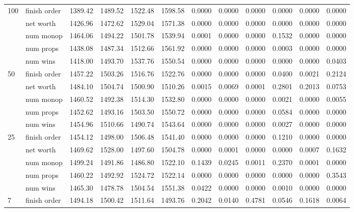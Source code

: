 \begin{landscape}
\begin{table}[ht]
\begin{tabularx}{\linewidth}{|p{1in}|p{1in}|r|r|r|r|r|r|r|r|r|r|}
      \multirow{5}{*}{100} & finish order & 1389.42 & 1489.52 & 1522.48 & 1598.58 & 0.0000 & 0.0000 & 0.0000 & 0.0000 & 0.0000 & 0.0000 \\
\cline{2-12}      & net worth & 1426.96 & 1472.62 & 1529.04 & 1571.38 & 0.0000 & 0.0000 & 0.0000 & 0.0000 & 0.0000 & 0.0000 \\
\cline{2-12}      & num monop & 1464.06 & 1494.22 & 1501.78 & 1539.94 & 0.0001 & 0.0000 & 0.0000 & 0.1532 & 0.0000 & 0.0000 \\
\cline{2-12}      & num props & 1438.08 & 1487.34 & 1512.66 & 1561.92 & 0.0000 & 0.0000 & 0.0000 & 0.0003 & 0.0000 & 0.0000 \\
\cline{2-12}      & num wins & 1418.00 & 1493.70 & 1537.76 & 1550.54 & 0.0000 & 0.0000 & 0.0000 & 0.0000 & 0.0000 & 0.0403 \\
      \cline{1-12}
      \multirow{5}{*}{50} & finish order & 1457.22 & 1503.26 & 1516.76 & 1522.76 & 0.0000 & 0.0000 & 0.0000 & 0.0400 & 0.0021 & 0.2124 \\
\cline{2-12}      & net worth & 1484.10 & 1504.74 & 1500.90 & 1510.26 & 0.0015 & 0.0069 & 0.0001 & 0.2801 & 0.2013 & 0.0753 \\
\cline{2-12}      & num monop & 1460.52 & 1492.38 & 1514.30 & 1532.80 & 0.0000 & 0.0000 & 0.0000 & 0.0021 & 0.0000 & 0.0055 \\
\cline{2-12}      & num props & 1452.62 & 1493.16 & 1503.50 & 1550.72 & 0.0000 & 0.0000 & 0.0000 & 0.0584 & 0.0000 & 0.0000 \\
\cline{2-12}      & num wins & 1454.96 & 1510.66 & 1490.74 & 1543.64 & 0.0000 & 0.0000 & 0.0000 & 0.0027 & 0.0000 & 0.0000 \\
      \cline{1-12}
      \multirow{5}{*}{25} & finish order & 1454.12 & 1498.00 & 1506.48 & 1541.40 & 0.0000 & 0.0000 & 0.0000 & 0.1210 & 0.0000 & 0.0000 \\
\cline{2-12}      & net worth & 1469.62 & 1528.00 & 1497.60 & 1504.78 & 0.0000 & 0.0001 & 0.0000 & 0.0000 & 0.0007 & 0.1632 \\
\cline{2-12}      & num monop & 1499.24 & 1491.86 & 1486.80 & 1522.10 & 0.1439 & 0.0245 & 0.0011 & 0.2370 & 0.0001 & 0.0000 \\
\cline{2-12}      & num props & 1460.22 & 1492.92 & 1524.72 & 1522.14 & 0.0000 & 0.0000 & 0.0000 & 0.0000 & 0.0000 & 0.3543 \\
\cline{2-12}      & num wins & 1465.30 & 1478.78 & 1504.54 & 1551.38 & 0.0422 & 0.0000 & 0.0000 & 0.0010 & 0.0000 & 0.0000 \\
      \cline{1-12}
      \multirow{5}{*}{7} & finish order & 1494.18 & 1500.42 & 1511.64 & 1493.76 & 0.2042 & 0.0140 & 0.4781 & 0.0546 & 0.1618 & 0.0064 \\

\end{tabularx}
\end{table}
\end{landscape}
